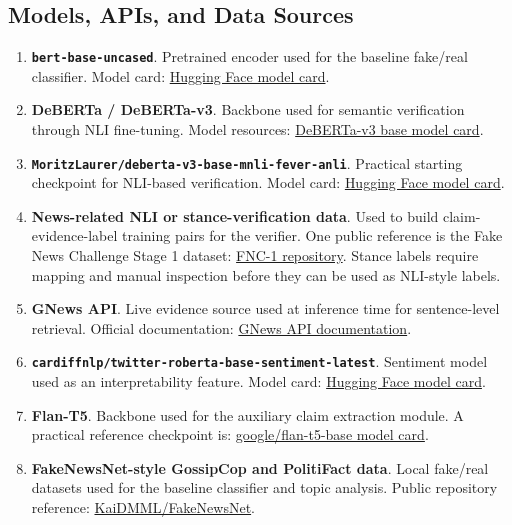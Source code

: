 \documentclass[11pt]{article}
\newcommand{\code}[1]{\texttt{#1}}
\begin{document}
\subsection{Models, APIs, and Data Sources}

\begin{enumerate}
    \item \textbf{\code{bert-base-uncased}}. Pretrained encoder used for the
    baseline fake/real classifier. Model card:
    \href{https://huggingface.co/google-bert/bert-base-uncased}{Hugging Face model card}.

    \item \textbf{DeBERTa / DeBERTa-v3}. Backbone used for semantic
    verification through NLI fine-tuning. Model resources:
    \href{https://huggingface.co/microsoft/deberta-v3-base}{DeBERTa-v3 base model card}.

    \item \textbf{\code{MoritzLaurer/deberta-v3-base-mnli-fever-anli}}.
    Practical starting checkpoint for NLI-based verification. Model card:
    \href{https://huggingface.co/MoritzLaurer/deberta-v3-base-mnli-fever-anli}{Hugging Face model card}.

    \item \textbf{News-related NLI or stance-verification data}. Used to build
    claim-evidence-label training pairs for the verifier. One public reference
    is the Fake News Challenge Stage 1 dataset:
    \href{https://github.com/FakeNewsChallenge/fnc-1}{FNC-1 repository}. Stance labels require mapping and manual inspection before they can be used as NLI-style labels.

    \item \textbf{GNews API}. Live evidence source used at inference time for
    sentence-level retrieval. Official documentation:
    \href{https://docs.gnews.io/}{GNews API documentation}.

    \item \textbf{\code{cardiffnlp/twitter-roberta-base-sentiment-latest}}.
    Sentiment model used as an interpretability feature. Model card:
    \href{https://huggingface.co/cardiffnlp/twitter-roberta-base-sentiment-latest}{Hugging Face model card}.

    \item \textbf{Flan-T5}. Backbone used for the auxiliary claim extraction
    module. A practical reference checkpoint is:
    \href{https://huggingface.co/google/flan-t5-base}{google/flan-t5-base model card}.

    \item \textbf{FakeNewsNet-style GossipCop and PolitiFact data}. Local
    fake/real datasets used for the baseline classifier and topic analysis.
    Public repository reference:
    \href{https://github.com/KaiDMML/FakeNewsNet}{KaiDMML/FakeNewsNet}.
\end{enumerate}
\end{document}
